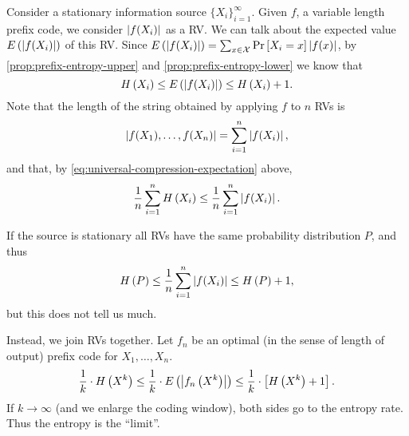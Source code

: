 Consider a stationary information source $\{X_i\}_{i=1}^\infty$.
Given $f$, a variable length prefix code, we consider $\left|{f(X_i)}\right|$ as a \ac{RV}.
We can talk about the expected value $E \left({\left|{f(X_i)}\right|}\right)$ of this \ac{RV}.
Since $E \left({\left|{f(X_i)}\right|}\right) = \sum_{x \in \mathcal{X}} \mathop{\mathrm{Pr}}\limits_{} \left[ {X_i = x} \right] \left|{f(x)}\right|$, by \cref{prop:prefix-entropy-upper} and \cref{prop:prefix-entropy-lower} we know that
\begin{equation} \label{eq:universal-compression-expectation}
	H\left({X_i}\right) \le E \left({\left|{f(X_i)}\right|}\right) \le H\left({X_i}\right) + 1.
\end{equation}
Note that the length of the string obtained by applying $f$ to $n$ \acp{RV} is
\begin{equation*}
	\left|{f(X_1), \dots, f(X_n)}\right| = \sum_{i=1}^n \left|{f(X_i)}\right|,
\end{equation*}
and that, by \cref{eq:universal-compression-expectation} above,
\begin{equation*}
	\frac{1}{n} \sum_{i=1}^n H\left({X_i}\right)
	\le
	\frac{1}{n} \sum_{i=1}^n \left|{f(X_i)}\right|.
\end{equation*}

If the source is stationary all \acp{RV} have the same probability distribution $P$, and thus
\begin{equation*}
	H\left({P}\right) \le \frac{1}{n} \sum_{i = 1}^n \left|{f(X_i)}\right| \le H\left({P}\right) + 1,
\end{equation*}
but this does not tell us much.

Instead, we join \acp{RV} together.
Let $f_n$ be an optimal (in the sense of length of output) prefix code for $X_1, \dots, X_n$.
\begin{equation*}
	\frac{1}{k} \cdot H\left({X^k}\right)
	\le
	\frac{1}{k} \cdot E \left({\left|{f_n \left( X^k \right)}\right|}\right)
	\le
	\frac{1}{k} \cdot \left[ H\left({X^k}\right) + 1 \right].
\end{equation*}
If $k \to \infty$ (and we enlarge the coding window), both sides go to the entropy rate.
Thus the entropy is the ``limit''.
